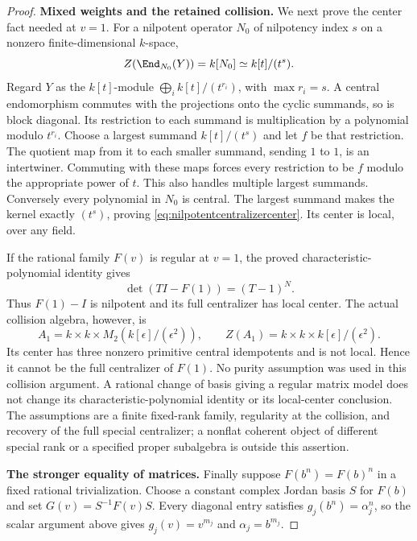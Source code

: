 \documentclass[11pt,a4paper]{article}
\theoremstyle{named}\newtheorem{finding}{Finding}[section]
\theoremstyle{definition}\newtheorem{definition}[finding]{Definition}
\theoremstyle{remark}\newtheorem{remark}[finding]{Remark}
\begin{document}
\begin{proof}
\par\smallskip\noindent\textbf{Mixed weights and the retained collision.}\quad
We next prove the center fact needed at $v=1$.
For a nilpotent operator $N_0$ of nilpotency index $s$
on a nonzero finite-dimensional $k$-space,
\begin{equation}\label{eq:nilpotentcentralizercenter}
 Z(\End_{N_0}(Y))=k[N_0]\simeq k[t]/(t^s).
\end{equation}
Regard $Y$ as the $k[t]$-module
$\bigoplus_i k[t]/(t^{r_i})$, with $\max r_i=s$.
A central endomorphism commutes with the projections
onto the cyclic summands, so is block diagonal.
Its restriction to each summand is multiplication by
a polynomial modulo $t^{r_i}$.
Choose a largest summand $k[t]/(t^s)$ and let $f$
be that restriction. The quotient map from it to each
smaller summand, sending $1$ to $1$, is an intertwiner.
Commuting with these maps forces every restriction to
be $f$ modulo the appropriate power of $t$.
This also handles multiple largest summands.
Conversely every polynomial in $N_0$ is central.
The largest summand makes the kernel exactly $(t^s)$,
proving \eqref{eq:nilpotentcentralizercenter}.
Its center is local, over any field.

If the rational family $F(v)$ is regular at $v=1$,
the proved characteristic-polynomial identity gives
\[
 \det(TI-F(1))=(T-1)^N.
\]
Thus $F(1)-I$ is nilpotent and its full centralizer has
local center. The actual collision algebra, however, is
\[
 A_1=k\times k\times M_2(k[\epsilon]/(\epsilon^2)),
\qquad
 Z(A_1)=k\times k\times k[\epsilon]/(\epsilon^2).
\]
Its center has three nonzero primitive central idempotents
and is not local. Hence it cannot be the full centralizer
of $F(1)$.
No purity assumption was used in this collision argument.
A rational change of basis giving a regular matrix model
does not change its characteristic-polynomial identity
or its local-center conclusion.
The assumptions are a finite fixed-rank family, regularity
at the collision, and recovery of the full special
centralizer; a nonflat coherent object of different
special rank or a specified proper subalgebra is outside
this assertion.

\par\smallskip\noindent\textbf{The stronger equality of matrices.}\quad
Finally suppose $F(b^n)=F(b)^n$ in a fixed rational
trivialization. Choose a constant complex Jordan basis
$S$ for $F(b)$ and set $G(v)=S^{-1}F(v)S$.
Every diagonal entry satisfies
$g_j(b^n)=\alpha_j^n$, so the scalar argument above gives
$g_j(v)=v^{m_j}$ and $\alpha_j=b^{m_j}$.


\end{proof}
\end{document}
